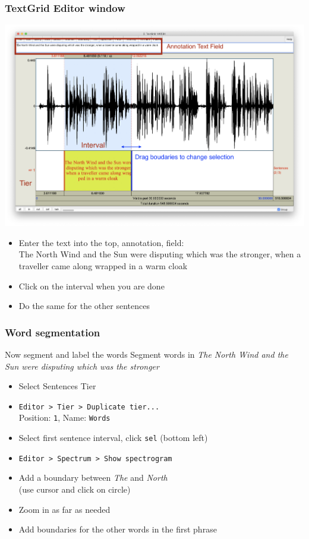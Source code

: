 \documentclass{beamer}
\begin{document}
\begin{frame} 
\frametitle{TextGrid Editor window} 

\includegraphics[width=0.71\framewidth]{img/Screenshot_Sentenses}
\vspace{-0.5cm}
\begin{itemize}
\item Enter the text into the top, annotation, field:\\
      {\scriptsize{The North Wind and the Sun were disputing which was the stronger, when a traveller came along wrapped in a warm cloak}}
\item Click on the interval when you are done
\item Do the same for the other sentences
\end{itemize}

\end{frame}

\begin{frame} 
\frametitle{Word segmentation} 
\begin{block}{Now segment and label the words}
Segment words in \textit{The North Wind and the Sun were disputing which was the stronger}
\end{block} 
\begin{itemize} 
\item Select Sentences Tier
\item \texttt{Editor > Tier > Duplicate tier...} \\Position: \texttt{1}, Name: \texttt{Words}
\item Select first sentence interval, click \texttt{sel} (bottom left)
\item \texttt{Editor > Spectrum > Show spectrogram}
\item Add a boundary between \textit{The} and \textit{North} \\(use cursor and click on circle)
\item Zoom in as far as needed
\item Add boundaries for the other words in the first phrase 
\end{itemize}
\end{frame}
\end{document}
